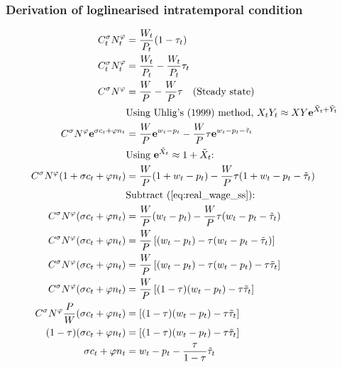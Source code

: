 \subsubsection*{Derivation of loglinearised intratemporal condition}
\begin{align}
    C_t^\sigma N_t^\varphi &= \frac{W_t}{P_t}(1-\tau_t) \\
    C_t^\sigma N_t^\varphi &= \frac{W_t}{P_t} - \frac{W_t}{P_t}\tau_t \\
    C^\sigma N^\varphi &= \frac{W}{P} - \frac{W}{P}\tau \label{eq:real_wage_ss} \quad \text{(Steady state)}\\
    &\text{Using Uhlig's (1999) method, $X_tY_t \approx XY\mathbf{e}^{\tilde{X}_t + \tilde{Y}_t}$}\nonumber\\
    C^\sigma N^\varphi\mathbf{e}^{\sigma c_t + \varphi n_t} &= \frac{W}{P}\mathbf{e}^{w_t - p_t} - \frac{W}{P}\tau \mathbf{e}^{w_t - p_t - \tilde{\tau}_t}\\
    &\text{Using $\mathbf{e}^{\tilde{X}_t} \approx 1 + {\tilde{X}_t}$: }\nonumber\\
    C^\sigma N^\varphi({1+\sigma c_t + \varphi n_t}) &= \frac{W}{P}({1+ w_t - p_t}) - \frac{W}{P}\tau ({1+ w_t - p_t - \tilde{\tau}_t})\\
    &\text{Subtract (\ref{eq:real_wage_ss}): } \nonumber\\
    C^\sigma N^\varphi({\sigma c_t + \varphi n_t}) &= \frac{W}{P}({w_t - p_t}) - \frac{W}{P}\tau ({w_t - p_t - \tilde{\tau}_t})\\
    C^\sigma N^\varphi({\sigma c_t + \varphi n_t}) &= \frac{W}{P}\left[({w_t - p_t}) - \tau ({w_t - p_t - \tilde{\tau}_t})\right]\\
    C^\sigma N^\varphi({\sigma c_t + \varphi n_t}) &= \frac{W}{P}\left[({w_t - p_t}) - \tau ({w_t - p_t}) - \tau \tilde{\tau}_t\right]\\
    C^\sigma N^\varphi({\sigma c_t + \varphi n_t}) &= \frac{W}{P}\left[(1-\tau)({w_t - p_t}) - \tau \tilde{\tau}_t\right]\\
    C^\sigma N^\varphi \frac{P}{W} ({\sigma c_t + \varphi n_t})  &= \left[(1-\tau)({w_t - p_t}) - \tau \tilde{\tau}_t\right]\\
    (1-\tau)({\sigma c_t + \varphi n_t})  &= \left[(1-\tau)({w_t - p_t}) - \tau \tilde{\tau}_t\right]  \label{eq:intratemporal_loglinear_final_step} \\
    {\sigma c_t + \varphi n_t}  &= {w_t - p_t} - \frac{\tau}{1-\tau}\tilde{\tau}_t
\end{align}
\newpage